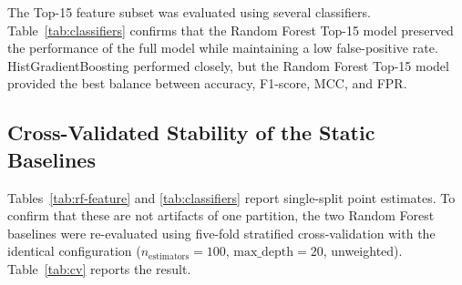 \documentclass[11pt,a4paper]{article}
\begin{document}
The Top-15 feature subset was evaluated using several classifiers.
Table~\ref{tab:classifiers} confirms that the Random Forest Top-15 model
preserved the performance of the full model while maintaining a low
false-positive rate. HistGradientBoosting performed closely, but the
Random Forest Top-15 model provided the best balance between accuracy,
F1-score, MCC, and FPR.

\begin{table}[!ht]
\centering
\caption{Classifier comparison with extended performance metrics
(single 80:20 stratified split, $\text{random\_state} = 42$).}
\label{tab:classifiers}
\small
{}
\end{table}

\subsection{Cross-Validated Stability of the Static Baselines}
\label{sec:cv}

Tables~\ref{tab:rf-feature} and \ref{tab:classifiers} report single-split
point estimates. To confirm that these are not artifacts of one
partition, the two Random Forest baselines were re-evaluated using
five-fold stratified cross-validation with the identical configuration
($n_{\text{estimators}} = 100$, $\text{max\_depth} = 20$, unweighted).
Table~\ref{tab:cv} reports the result.
\end{document}
